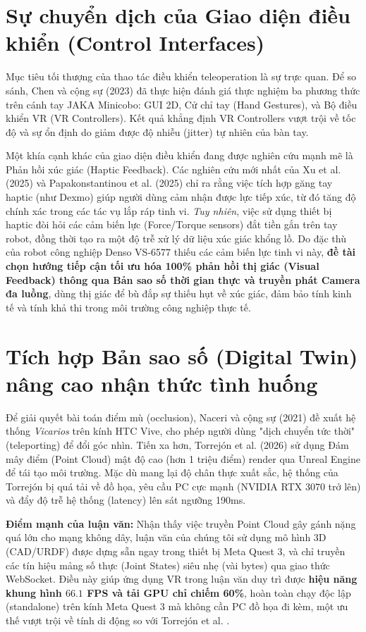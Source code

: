 \section{Sự chuyển dịch của Giao diện điều khiển (Control Interfaces)}
Mục tiêu tối thượng của thao tác điều khiển teleoperation là sự trực quan. Để so sánh, Chen và cộng sự (2023) \cite{chen2023comparing} đã thực hiện đánh giá thực nghiệm ba phương thức trên cánh tay JAKA Minicobo: GUI 2D, Cử chỉ tay (Hand Gestures), và Bộ điều khiển VR (VR Controllers). Kết quả khẳng định VR Controllers vượt trội về tốc độ và sự ổn định do giảm được độ nhiễu (jitter) tự nhiên của bàn tay. 

Một khía cạnh khác của giao diện điều khiển đang được nghiên cứu mạnh mẽ là Phản hồi xúc giác (Haptic Feedback). Các nghiên cứu mới nhất của Xu et al. (2025) \cite{xu2025immersive} và Papakonstantinou et al. (2025) \cite{papakonstantinou2025effect} chỉ ra rằng việc tích hợp găng tay haptic (như Dexmo) giúp người dùng cảm nhận được lực tiếp xúc, từ đó tăng độ chính xác trong các tác vụ lắp ráp tinh vi. 
\textit{Tuy nhiên}, việc sử dụng thiết bị haptic đòi hỏi các cảm biến lực (Force/Torque sensors) đắt tiền gắn trên tay robot, đồng thời tạo ra một độ trễ xử lý dữ liệu xúc giác khổng lồ. Do đặc thù của robot công nghiệp Denso VS-6577 thiếu các cảm biến lực tinh vi này, \textbf{đề tài chọn hướng tiếp cận tối ưu hóa 100\% phản hồi thị giác (Visual Feedback) thông qua Bản sao số thời gian thực và truyền phát Camera đa luồng}, dùng thị giác để bù đắp sự thiếu hụt về xúc giác, đảm bảo tính kinh tế và tính khả thi trong môi trường công nghiệp thực tế.

\section{Tích hợp Bản sao số (Digital Twin) nâng cao nhận thức tình huống}
Để giải quyết bài toán điểm mù (occlusion), Naceri và cộng sự (2021) \cite{naceri2021vicarios} đề xuất hệ thống \textit{Vicarios} trên kính HTC Vive, cho phép người dùng "dịch chuyển tức thời" (teleporting) để đổi góc nhìn. Tiến xa hơn, Torrejón et al. (2026) \cite{torrejon2026teleoperation} sử dụng Đám mây điểm (Point Cloud) mật độ cao (hơn 1 triệu điểm) render qua Unreal Engine để tái tạo môi trường. Mặc dù mang lại độ chân thực xuất sắc, hệ thống của Torrejón bị quá tải về đồ họa, yêu cầu PC cực mạnh (NVIDIA RTX 3070 trở lên) và đẩy độ trễ hệ thống (latency) lên sát ngưỡng 190ms.

\textbf{Điểm mạnh của luận văn:} Nhận thấy việc truyền Point Cloud gây gánh nặng quá lớn cho mạng không dây, luận văn của chúng tôi sử dụng mô hình 3D (CAD/URDF) được dựng sẵn ngay trong thiết bị Meta Quest 3, và chỉ truyền các tín hiệu mảng số thực (Joint States) siêu nhẹ (vài bytes) qua giao thức WebSocket. Điều này giúp ứng dụng VR trong luận văn duy trì được \textbf{hiệu năng khung hình $66.1$ FPS và tải GPU chỉ chiếm 60\%}, hoàn toàn chạy độc lập (standalone) trên kính Meta Quest 3 mà không cần PC đồ họa đi kèm, một ưu thế vượt trội về tính di động so với Torrejón et al. \cite{torrejon2026teleoperation}.

